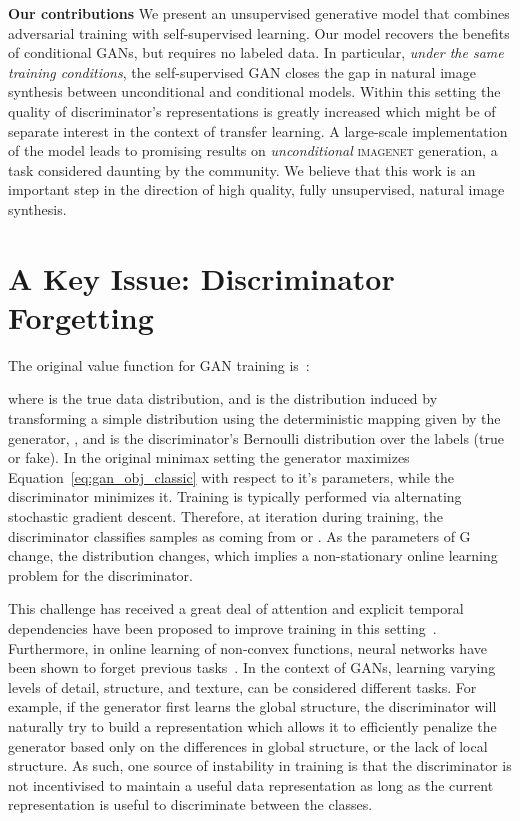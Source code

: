 \documentclass[10pt,twocolumn,letterpaper]{article}
\newcommand{\imagenet}{\textsc{imagenet}}
\begin{document}
\noindent\textbf{Our contributions}\quad
We present an unsupervised generative model that combines adversarial training with self-supervised learning.
Our model recovers the benefits of conditional GANs, but requires no labeled data.
In particular, \emph{under the same training conditions}, the self-supervised GAN closes the gap in natural image synthesis between unconditional and conditional models. Within this setting the quality of discriminator's representations is greatly increased which might be of separate interest in the context of transfer learning. A large-scale implementation of the model leads to promising results on \emph{unconditional} \imagenet{} generation, a task considered daunting by the community. We believe that this work is an important step in the direction of high quality, fully unsupervised, natural image synthesis.
 \section{A Key Issue: Discriminator Forgetting}

The original value function for GAN training is~\citep{goodfellow2014generative}:

where  is the true data distribution, and  is the distribution induced by transforming a simple distribution  using the deterministic mapping given by the generator, , and  is the discriminator's Bernoulli distribution over the labels (true or fake). In the original minimax setting the generator maximizes Equation~\ref{eq:gan_obj_classic} with respect to it's parameters, while the discriminator minimizes it. Training is typically performed via alternating stochastic gradient descent. Therefore, at iteration  during training, the discriminator classifies samples as coming from  or  . As the parameters of G change, the distribution  changes, which implies a non-stationary online learning problem for the discriminator.

This challenge has received a great deal of attention and explicit temporal dependencies have been proposed to improve training in this setting~\citep{salimans2016improved,anonymous2019generative,shrivastava2017learning,grnarova2017online}. Furthermore, in online learning of non-convex functions, neural networks have been shown to forget previous tasks~\citep{kirkpatrick2017overcoming,mccloskey1989catastrophic,french1999catastrophic}. In the context of GANs, learning varying levels of detail, structure, and texture, can be considered different tasks. For example, if the generator first learns the global structure, the discriminator will naturally try to build a representation which allows it to efficiently penalize the generator based only on the differences in global structure, or the lack of local structure. As such, one source of instability in training is that the discriminator is not incentivised to maintain a useful data representation as long as the current representation is useful to discriminate between the classes.
\end{document}
